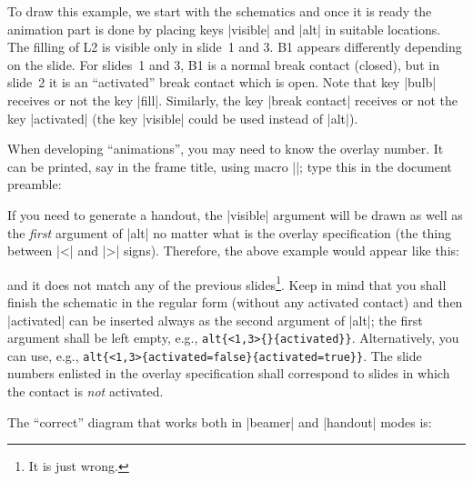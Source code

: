 \documentclass[a4paper]{ltxdoc}
\begin{document}
To draw this example, we start with the schematics and once it is ready the animation part is done by placing keys |visible| and |alt| in suitable locations. The filling of L2 is visible only in slide~1 and 3. B1 appears differently depending on the slide. For slides~1 and 3, B1 is a normal break contact (closed), but in slide~2 it is an ``activated'' break contact which is open. Note that key |bulb| receives or not the key |fill|. Similarly, the key |break contact| receives or not the key |activated| (the key |visible| could be used instead of |alt|).

When developing ``animations'', you may need to know the overlay number. It can be printed, say in the frame title, using macro |\overlaynumber|; type this in the document preamble:

\begin{codeexample}
\makeatletter
\newcommand*{\overlaynumber}{\number\beamer@slideinframe}
\makeatother
\end{codeexample}

If you need to generate a handout, the |visible| argument will be drawn as well as the \emph{first} argument of |alt| no matter what is the overlay specification (the thing between |<| and |>| signs). Therefore, the above example would appear like this:
\begin{codeexample}[width=2.5cm]
\end{codeexample}
\noindent{}and it does not match any of the previous slides\footnote{It is just wrong.}. Keep in mind that you shall finish the schematic in the regular form (without any activated contact) and then |activated| can be inserted always as the second argument of |alt|; the first argument shall be left empty, e.g., \verb|alt{<1,3>{}{activated}}|. Alternatively, you can use, e.g., \verb|alt{<1,3>{activated=false}{activated=true}}|. The slide numbers enlisted in the overlay specification shall correspond to slides in which the contact is \emph{not} activated.

The ``correct'' diagram that works both in |beamer| and |handout| modes is:
\end{document}
